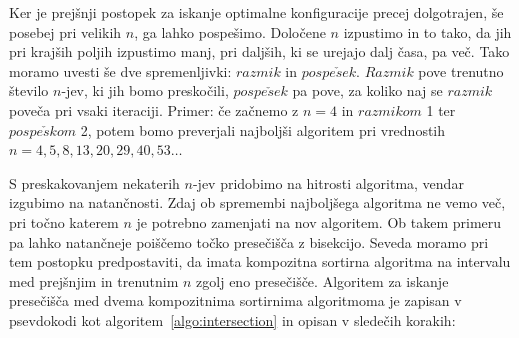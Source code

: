 \documentclass[a4paper,oneside,12pt]{article}
\begin{document}
Ker je prejšnji postopek za iskanje optimalne konfiguracije precej dolgotrajen, še posebej
pri velikih $n$, ga lahko pospešimo. Določene $n$ izpustimo in to tako, da jih pri krajših
poljih izpustimo manj, pri daljših, ki se urejajo dalj časa, pa več. Tako moramo uvesti še
dve spremenljivki: $razmik$ in $pospe\check{s}ek$. $Razmik$ pove trenutno število $n$-jev, ki jih
bomo preskočili, $pospe\check{s}ek$ pa pove, za koliko naj se $razmik$ poveča pri vsaki iteraciji.
Primer: če začnemo z $n = 4$ in $razmikom$ 1 ter $pospe\check{s}kom$ 2, potem bomo preverjali
najboljši algoritem pri vrednostih \mbox{$n = 4, 5, 8, 13, 20, 29, 40, 53 \dots$}

S preskakovanjem nekaterih $n$-jev pridobimo na hitrosti algoritma, vendar izgubimo na
natančnosti. Zdaj ob spremembi najboljšega algoritma ne vemo več, pri točno katerem $n$ je
potrebno zamenjati na nov algoritem. Ob takem primeru pa lahko natančneje poiščemo točko
presečišča z bisekcijo. Seveda moramo pri tem postopku predpostaviti, da imata kompozitna
sortirna algoritma na intervalu med prejšnjim in trenutnim $n$ zgolj eno presečišče.
Algoritem za iskanje presečišča med dvema kompozitnima sortirnima algoritmoma je zapisan v
psevdokodi kot algoritem~\ref{algo:intersection} in opisan v sledečih korakih:
\end{document}
